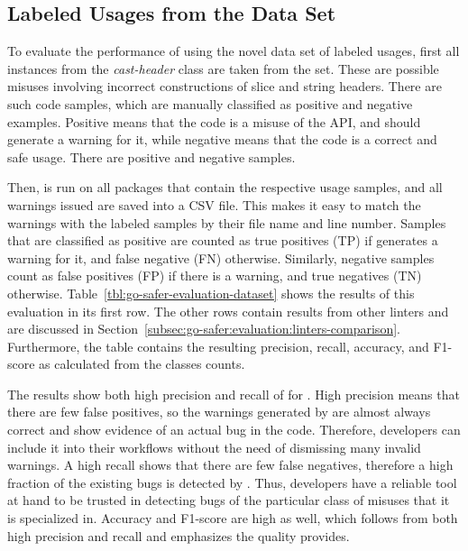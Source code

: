 \subsection{Labeled Usages from the Data Set}\label{subsec:go-safer:evaluation:labeled-usages}

To evaluate the performance of \toolSafer{} using the novel data set of labeled \unsafe{} usages, first all instances
from the \textit{cast-header} class are taken from the set.
These are possible misuses involving incorrect constructions of slice and string headers.
There are  such code samples, which are manually classified as positive and negative examples.
Positive means that the code is a misuse of the \unsafe{} \acrshort{API}, and \toolSafer{} should generate a warning for
it, while negative means that the code is a correct and safe usage.
There are  positive and  negative samples.

Then, \toolSafer{} is run on all packages that contain the respective  \unsafe{} usage samples, and all
warnings issued are saved into a \acrshort{CSV} file.
This makes it easy to match the warnings with the labeled samples by their file name and line number.
Samples that are classified as positive are counted as true positives (TP) if \toolSafer{} generates a warning for it,
and false negative (FN) otherwise.
Similarly, negative samples count as false positives (FP) if there is a warning, and true negatives (TN) otherwise.
Table~\ref{tbl:go-safer-evaluation-dataset} shows the results of this evaluation in its first row.
The other rows contain results from other linters and are discussed in
Section~\ref{subsec:go-safer:evaluation:linters-comparison}.
Furthermore, the table contains the resulting precision, recall, accuracy, and F1-score as calculated from the classes
counts.



The results show both high precision and recall of  for \toolSafer{}.
High precision means that there are few false positives, so the warnings generated by \toolSafer{} are almost always
correct and show evidence of an actual bug in the code.
Therefore, developers can include it into their workflows without the need of dismissing many invalid warnings.
A high recall shows that there are few false negatives, therefore a high fraction of the existing bugs is detected by
\toolSafer{}.
Thus, developers have a reliable tool at hand to be trusted in detecting bugs of the particular class of \unsafe{}
misuses that it is specialized in.
Accuracy and F1-score are high as well, which follows from both high precision and recall and emphasizes the quality
\toolSafer{} provides.


